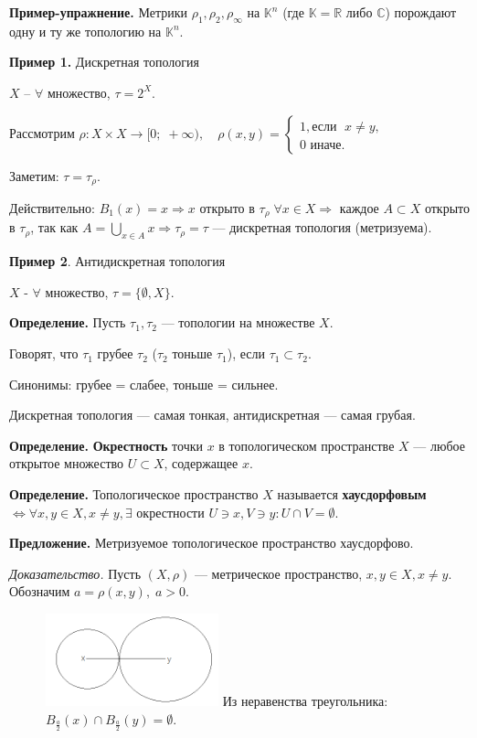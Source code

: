 \documentclass[12pt,a4paper]{article}
\begin{document}
\textbf{Пример-упражнение.} Метрики $\rho_1, \rho_2, \rho_{\infty}$ на $\mathbb{K}^n$ (где $\mathbb{K} = \mathbb{R}$ либо $\mathbb{C}$) порождают одну и ту же топологию на $\mathbb{K}^n.$

\textbf{Пример 1.} Дискретная топология

$X$ -- $\forall$ множество, $\tau = 2^X.$

Рассмотрим $\rho: X \times X \to [0; \; +\infty), \quad \rho(x,y) = \begin{cases} 1, \text{если } \; x \neq y, \\ 0 \text{ иначе.} \end{cases}$

Заметим: $\tau = \tau_{\rho}.$

Действительно: $B_1(x) = {x} \Rightarrow {x}$ открыто в $\tau_{\rho} \; \forall x \in X \Rightarrow$ каждое $A \subset X$ открыто в $\tau_{\rho}$, так как $A = \bigcup_{x\in A} {x} \Rightarrow \tau_{\rho} = \tau$ --- дискретная топология (метризуема).

\textbf{Пример 2}. Антидискретная топология

$X$ - $\forall$ множество, $\tau = \{\emptyset, X\}.$

\textbf{Определение.} Пусть $\tau_1, \tau_2$ --- топологии на множестве $X.$

Говорят, что $\tau_1$ грубее $\tau_2$ ($\tau_2$ тоньше $\tau_1$), если $\tau_1 \subset \tau_2.$

Синонимы: грубее = слабее, тоньше = сильнее.

Дискретная топология --- самая тонкая, антидискретная --- самая грубая.

\textbf{Определение.} \textbf{Окрестность} точки $x$ в топологическом пространстве $X$ --- любое открытое множество $U \subset X$, содержащее $x.$

\textbf{Определение.} Топологическое пространство $X$ называется \textbf{хаусдорфовым} $\Leftrightarrow \forall x, y \in X, x \neq y, \exists$ окрестности $U \ni x, V \ni y: U \cap V = \emptyset.$

\textbf{Предложение.} Метризуемое топологическое пространство хаусдорфово.

\textit{Доказательство.} Пусть $(X, \rho)$ --- метрическое пространство, $x, y \in X, x \neq y$. Обозначим $a = \rho(x, y), \; a > 0.$

\begin{figure}
	\includegraphics[width = 5cm]{lect2_4.png}
	Из неравенства треугольника: $B_{\frac{a}{2}}(x) \cap B_{\frac{a}{2}}(y) = \emptyset.$
\end{figure}
\end{document}
